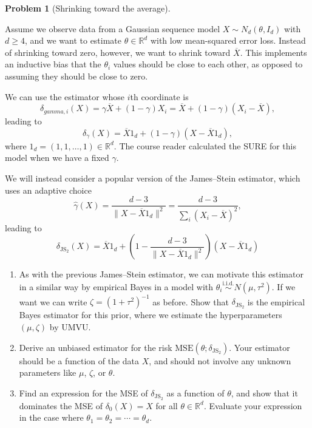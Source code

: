 \documentclass{article}
\newcommand{\RR}{\mathbb{R}}
\newcommand{\simiid}{\overset{\text{i.i.d.}}{\sim}}
\theoremstyle{definition}
\newtheorem{problem}{Problem}
\begin{document}
\begin{problem}[Shrinking toward the average]
\label{prob:shrinking-avg}

  Assume we observe data from a Gaussian sequence model $X \sim N_d(\theta, I_d)$ with $d \geq 4$, and we want to estimate $\theta\in \RR^d$ with low mean-squared error loss. Instead of shrinking toward zero, however, we want to shrink toward $\overline{X}$. This implements an inductive bias that the $\theta_i$ values should be close to each other, as opposed to assuming they should be close to zero.

We can use the estimator whose $i$th coordinate is
\[
\delta_{gamma,i}(X) = \gamma \overline{X} + (1-\gamma) X_i = \overline{X} + (1-\gamma)(X_i - \overline{X}),
\]
leading to 
\[
\delta_{\gamma}(X) = \overline{X} 1_d + (1-\gamma)(X - \overline{X}1_d),
\]
where $1_d = (1,1,\ldots,1) \in \RR^d$. The course reader calculated the SURE for this model when we have a fixed $\gamma$.

We will instead consider a popular version of the James--Stein estimator, which uses an adaptive choice
\[
\hat\gamma(X) = \frac{d-3}{\|X - \overline{X} 1_d\|^2} = \frac{d-3}{\sum_i (X_i - \overline{X})^2},
\]
leading to
\[
\delta_{\text{JS}_2}(X) = \overline{X} 1_d + \left(1 - \frac{d-3}{\|X - \overline{X} 1_d\|^2}\right) (X - \overline{X} 1_d)
\]

\begin{enumerate}[label=(\alph*)]
\item As with the previous James--Stein estimator, we can motivate this estimator in a similar way by empirical Bayes in a model with $\theta_i \simiid N(\mu, \tau^2)$. If we want we can write $\zeta = (1+\tau^2)^{-1}$ as before. Show that $\delta_{\text{JS}_2}$ is the empirical Bayes estimator for this prior, where we estimate the hyperparameters $(\mu,\zeta)$ by UMVU.





\item Derive an unbiased estimator for the risk $\text{MSE}(\theta; \delta_{\text{JS}_2})$. Your estimator should be a function of the data $X$, and should not involve any unknown parameters like $\mu$, $\zeta$, or $\theta$.




\item Find an expression for the MSE of $\delta_{\text{JS}_2}$ as a function of $\theta$, and show that it dominates the MSE of $\delta_0(X) = X$ for all $\theta \in \RR^d$. Evaluate your expression in the case where $\theta_1 = \theta_2 = \cdots = \theta_d$.





\end{enumerate}
\end{problem}
\end{document}
